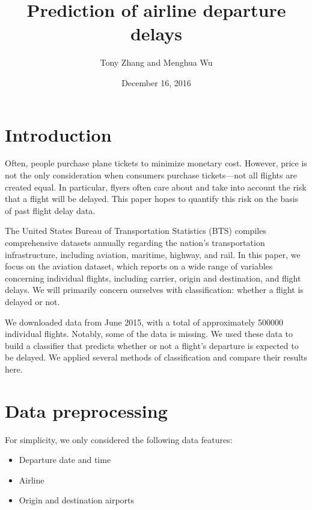 \documentclass{article}
\title{Prediction of airline departure delays}
\author{Tony Zhang and Menghua Wu}
\date{December 16, 2016}
\begin{document}
\maketitle

\begin{multicols}{2}


\section{Introduction}

Often, people purchase plane tickets
to minimize monetary cost.
However, price is not the only consideration
when consumers purchase tickets---not
all flights are created equal.
In particular,
flyers often care about and take into account
the risk that a flight will be delayed.
This paper hopes to quantify this risk
on the basis of past flight delay data.

The United States Bureau of Transportation Statistics (BTS)
compiles comprehensive datasets annually
regarding the nation's transportation infrastructure,
including aviation, maritime, highway, and rail.
In this paper, we focus on the aviation dataset,
which reports on a wide range of variables concerning individual flights,
including carrier, origin and destination, and flight delays.
We will primarily concern ourselves with classification:
whether a flight is delayed or not.

We downloaded data from June 2015,
with a total of approximately 500000 individual flights.
Notably, some of the data is missing.
We used these data to build a classifier
that predicts whether or not a flight's departure
is expected to be delayed.
We applied several methods of classification
and compare their results here.


\section{Data preprocessing}


For simplicity,
we only considered the following data features:
\begin{itemize}
    \item
    Departure date and time
    \item
    Airline
    \item
    Origin and destination airports
\end{itemize}


\end{multicols}
\end{document}

